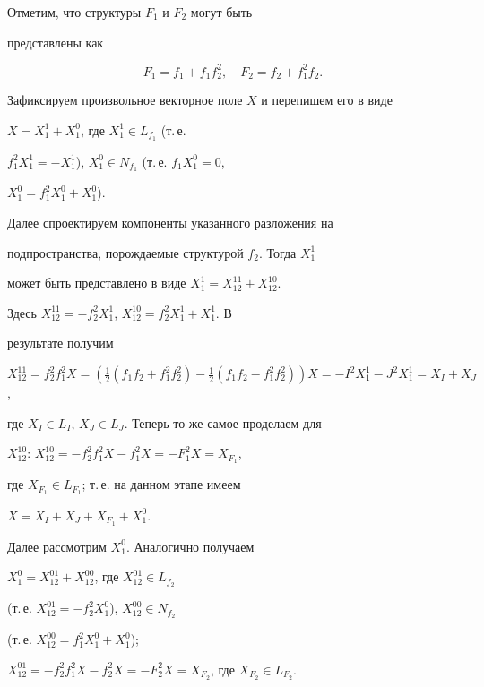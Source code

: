 \begin{pf}


Отметим, что структуры $F_1$ и $F_2$ могут быть


представлены как


$$


F_1=f_1+f_1f_2^2,\quad F_2=f_2+f_1^2f_2.


$$





Зафиксируем произвольное векторное поле $X$ и перепишем его в виде


$X=X_1^1+X_1^0$, где $X_1^1\in L_{f_1}$ (т.\,е.


$f_1^2X_1^1=-X_1^1$), $X_1^0\in N_{f_1}$ (т.\,е. $f_1X_1^0=0$,


$X_1^0=f_1^2X_1^0+X_1^0$).





Далее спроектируем компоненты указанного разложения на


подпространства, порождаемые структурой $f_2$. Тогда $X_1^1$


может быть представлено в виде $X_1^1=X_{12}^{11}+X_{12}^{10}$.


Здесь $X_{12}^{11}=-f_2^2X_1^1$, $X_{12}^{10}=f_2^2X_1^1+X_1^1$. В


результате получим


$X_{12}^{11}=f_2^2f_1^2X=(\frac{1}{2}(f_1f_2+f_1^2f_2^2)-


\frac{1}{2}(f_1f_2-f_1^2f_2^2))X = -I^2X_1^1-J^2X_1^1=X_I+X_J$,


где $X_I\in L_I$, $X_J\in L_J$. Теперь то же самое проделаем для


$X_{12}^{10}$: $X_{12}^{10}=-f_2^2f_1^2X-f_1^2X=-F_1^2X=X_{F_1}$,


где $X_{F_1}\in L_{F_1}$; т.\,е. на данном этапе имеем


$X=X_I+X_J+X_{F_1}+X_1^0$.





Далее рассмотрим $X_1^0$. Аналогично получаем


$X_1^0=X_{12}^{01}+X_{12}^{00}$, где $X_{12}^{01}\in L_{f_2}$


(т.\,е. $X_{12}^{01}=-f_2^2X_1^0$), $X_{12}^{00}\in N_{f_2}$


(т.\,е. $X_{12}^{00}=f_1^2X_1^0+X_1^0$);


$X_{12}^{01}=-f_2^2f_1^2X-f_2^2X=-F_2^2X=X_{F_2}$, где $X_{F_2}\in


L_{F_2}$.






\end{pf}
